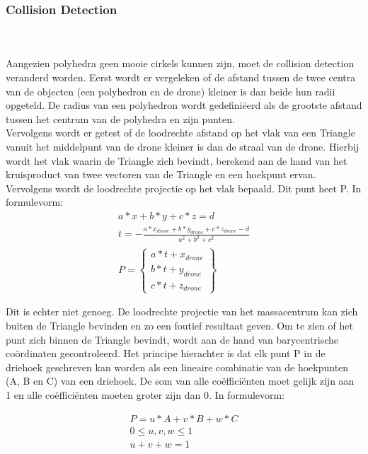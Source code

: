 \subsubsection{Collision Detection}
\\\\
Aangezien polyhedra geen mooie cirkels kunnen zijn, moet de collision detection veranderd worden. Eerst wordt er vergeleken of de afstand tussen de twee centra van de objecten (een polyhedron en de drone) kleiner is dan beide hun radii opgeteld. De radius van een polyhedron wordt gedefiniëerd als de grootste afstand tussen het centrum van de polyhedra en zijn punten. \\
\noindent
Vervolgens wordt er getest of de loodrechte afstand op het vlak van een Triangle vanuit het middelpunt van de drone kleiner is dan de straal van de drone. Hierbij wordt het vlak waarin de Triangle zich bevindt, berekend aan de hand van het kruisproduct van twee vectoren van de Triangle en een hoekpunt ervan. Vervolgens wordt de loodrechte projectie op het vlak bepaald. Dit punt heet P. In formulevorm: 
\begin{gather*}
	a*x + b*y + c*z = d \\ 
	t = -\frac{a * x_{drone} + b * y_{drone} + c * z_{drone} - d}{a^2 + b^2 + c^2}  \\ P =
	\begin{Bmatrix}
	a*t + x_{drone}\\ 
	b*t + y_{drone}\\ 
	c*t + z_{drone}
	\end{Bmatrix}
\end{gather*}

\noindent
 Dit is echter niet genoeg. De loodrechte projectie van het massacentrum  kan zich buiten de Triangle bevinden en zo een foutief resultaat geven. Om te zien of het punt zich binnen de Triangle bevindt, wordt aan de hand van barycentrische coördinaten gecontroleerd. Het principe hierachter is dat elk punt P in de driehoek geschreven kan worden als een lineaire combinatie van de hoekpunten (A, B en C) van een driehoek. De som van alle coëfficiënten moet gelijk zijn aan 1 en alle coëfficiënten moeten groter zijn dan 0. In formulevorm:
 
 \begin{gather*}
 	P = u*A + v*B + w*C \\
 	0 \le u,v,w \le 1 \\
 	u + v + w = 1
 \end{gather*}

